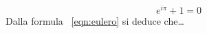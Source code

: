 \begin{equation}
  \label{eqn:eulero}
  e^{i\pi}+1=0
\end{equation}
Dalla formula ~\eqref{eqn:eulero} si deduce che\dots
